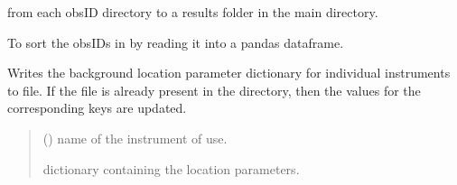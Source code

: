 \documentclass[letterpaper,10pt,english]{sphinxmanual}
\begin{document}
\begin{fulllineitems}
\begin{fulllineitems}
\begin{description}
\begin{description}
\sphinxAtStartPar
from each obsID directory to a results folder in the main directory.

\end{description}

\end{description}

\end{fulllineitems}


\begin{fulllineitems}
\label{\detokenize{xmmPipeline:xmmPipeline.epicObj.epicObj.sortObsIDs}}
\pysigstartsignatures
{}
\pysigstopsignatures
\sphinxAtStartPar
To sort the obsIDs in  by reading it into a pandas dataframe.

\end{fulllineitems}


\begin{fulllineitems}
\label{\detokenize{xmmPipeline:xmmPipeline.epicObj.epicObj.updateCCDcoordsPickle}}
\pysigstartsignatures
{}
\pysigstopsignatures
\sphinxAtStartPar
Writes the background location parameter dictionary for individual instruments
  to  file.
If the file is already present in the directory, then the values for the
corresponding keys are updated.
\begin{quote}\begin{description}
\sphinxAtStartPar
{} () \textendash{} name of the instrument of use.

\sphinxAtStartPar
{} dictionary containing the location parameters.


\end{description}
\end{quote}
\end{fulllineitems}
\end{fulllineitems}
\end{document}
